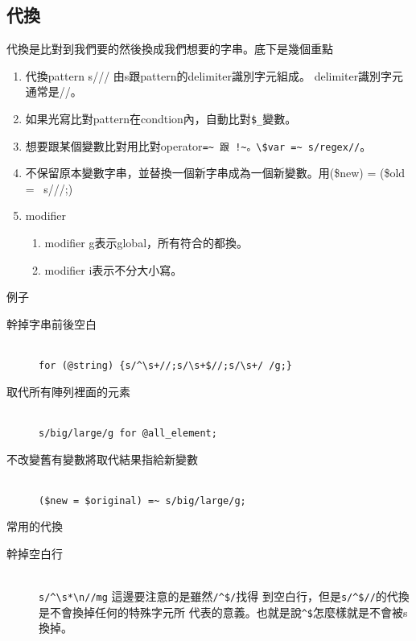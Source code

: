     \subsection{代換}
    代換是比對到我們要的然後換成我們想要的字串。底下是幾個重點
    \begin{enumerate}
    \item 代換pattern s///  由s跟pattern的delimiter識別字元組成。
	  delimiter識別字元通常是//。
    \item 如果光寫比對pattern在condtion內，自動比對\verb=$_=變數。
    \item 想要跟某個變數比對用比對operator\verb#=~ 跟 !~。\$var =~ s/regex//#。
    \item 不保留原本變數字串，並替換一個新字串成為一個新變數。用(\$new) = (\$old =~ s///;)
    \item modifier
	    \begin{enumerate}
	    \item modifier g表示global，所有符合的都換。
	    \item modifier i表示不分大小寫。
	    \end{enumerate}
    \end{enumerate}

    例子
    \begin{description}
      \item[幹掉字串前後空白] \hfill \\
      \verb=for (@string) {s/^\s+//;s/\s+$//;s/\s+/ /g;}=
      \item[取代所有陣列裡面的元素] \hfill \\
      \verb=s/big/large/g for @all_element;=
      \item[不改變舊有變數將取代結果指給新變數] \hfill \\
      \verb|($new = $original) =~ s/big/large/g;|
    \end{description}

    常用的代換
    \begin{description}
      \item[幹掉空白行] \hfill \\
      \verb=s/^\s*\n//mg= 這邊要注意的是雖然\verb=/^$/=找得
          到空白行，但是\verb=s/^$//=的代換是不會換掉任何的特殊字元所
	  代表的意義。也就是說\verb=^$=怎麼樣就是不會被s換掉。
    \end{description}



